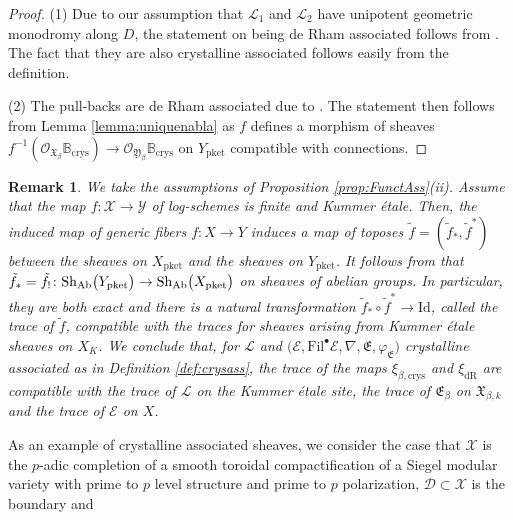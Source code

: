 \documentclass[asterisque,english]{smfart}
\newtheorem{remark}[theo]{Remark}
\begin{document}
\begin{proof} (1) Due to our assumption that $\mathcal{L}_1$ and $\mathcal{L}_2$ have unipotent geometric monodromy along $D$, the statement on being de Rham associated follows from  \cite[Thm. 3.2.12]{DLLZb}. The fact that they are also crystalline associated follows easily from the definition.

(2) The pull-backs are de Rham associated due to \cite[Thm. 3.2.7(4)]{DLLZb}. The statement then follows from Lemma \ref{lemma:uniquenabla} as $f$ defines a morphism of sheaves $f^{-1}\left(\mathcal{O}_{\mathfrak{X}_\beta} \mathbb{B}_{\mathrm{crys}}\right)  \to \mathcal{O}_{\mathfrak{Y}_\beta} \mathbb{B}_{\mathrm{crys}}$ on $Y_{\mathrm{pket}}$ compatible with connections. 
\end{proof}

\begin{remark}\label{rmk:traceasociated} We take the assumptions of Proposition \ref{prop:FunctAss}(ii). Assume that the map $f\colon \mathcal{X}\to \mathcal{Y}$ of log-schemes is finite and Kummer \'etale. Then, the induced map of generic fibers $f\colon X\to Y$ induces a map of toposes $\tilde{f}=(\tilde{f}_\ast,\tilde{f}^\ast)$ between the sheaves on  $X_{\mathrm{pket}}$ and the sheaves on $Y_{\mathrm{pket}}$. It follows from \cite[Prop. 4.5.2]{DLLZb}  that $\tilde{f}_\ast=\tilde{f}_!\colon \mathrm{Sh}_{\rm Ab}\bigl(Y_{\mathrm{pket}}\bigr) \rightarrow \mathrm{Sh}_{\rm Ab}\bigl(X_{\mathrm{pket}}\bigr)$ on sheaves of abelian groups. In particular, they are both exact and there is a natural transformation $\tilde{f}_\ast \circ \tilde{f}^\ast\to \mathrm{Id}$, called the trace of $\tilde{f}$, compatible with the traces for sheaves arising from  Kummer \'etale sheaves on $X_K$.  We conclude that, for  $\mathcal{L}$ and $\bigl(\mathcal{E},\mathrm{Fil}^\bullet \mathcal{E}, \nabla,\mathfrak{E},\varphi_{\mathfrak{E}}\bigr) $  crystalline  associated  as in Definition \ref{def:crysass}, the trace of the maps $\xi_{\beta,\mathrm{crys}}$ and $\xi_{\mathrm{dR}}$ are compatible  with the trace of $\mathcal{L}$ on the Kummer \'etale site, the trace of $\mathfrak{E}_{\beta}$ on  $\mathfrak{X}_{\beta,k}$ and the trace of $\mathcal{E}$ on  $X$. 
\end{remark}

As an example of crystalline associated sheaves, we consider the case that $\mathcal{X}$ is the $p$-adic completion of a smooth toroidal compactification of a Siegel modular variety with prime to $p$ level structure and prime to $p$ polarization, $\mathcal{D}\subset \mathcal{X}$ is the boundary and
\smallskip
\end{document}
